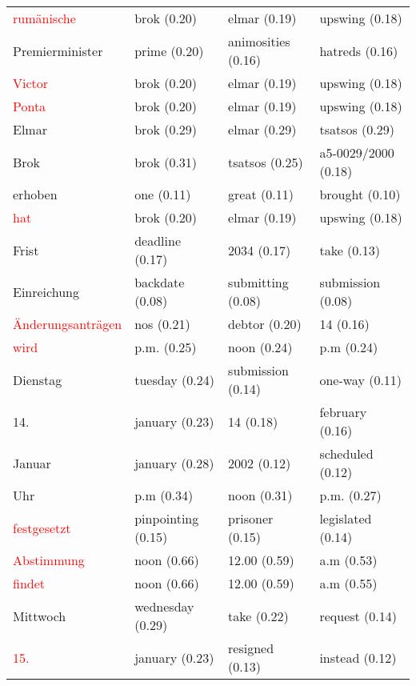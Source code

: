 \documentclass[11pt,twoside,openright]{mpreport}
\begin{document}
\begin{scriptsize}
\begin{tabular}{|llll|}
\textcolor{red}{rumänische}             & brok (0.20) & elmar (0.19) & upswing (0.18) \\
Premierminister         & prime (0.20) & animosities (0.16) & hatreds (0.16) \\ %
\textcolor{red}{Victor}                  & brok (0.20) & elmar (0.19) & upswing (0.18) \\
\textcolor{red}{Ponta}                   & brok (0.20) & elmar (0.19) & upswing (0.18) \\
Elmar                   & brok (0.29) & elmar (0.29) & tsatsos (0.29) \\ %
Brok                    & brok (0.31) & tsatsos (0.25) & a5-0029/2000 (0.18) \\ %
erhoben                 & one (0.11) & great (0.11) & brought (0.10) \\ %
\textcolor{red}{hat}                     & brok (0.20) & elmar (0.19) & upswing (0.18) \\
Frist                   & deadline (0.17) & 2034 (0.17) & take (0.13) \\ %
Einreichung             & backdate (0.08) & submitting (0.08) & submission (0.08) \\ %
\textcolor{red}{Änderungsanträgen}     & nos (0.21) & debtor (0.20) & 14 (0.16) \\
\textcolor{red}{wird}                    & p.m. (0.25) & noon (0.24) & p.m (0.24) \\
Dienstag                & tuesday (0.24) & submission (0.14) & one-way (0.11) \\ %
14.                     & january (0.23) & 14 (0.18) & february (0.16) \\ %
Januar                  & january (0.28) & 2002 (0.12) & scheduled (0.12) \\ %
Uhr                     & p.m (0.34) & noon (0.31) & p.m. (0.27) \\ %
\textcolor{red}{festgesetzt}             & pinpointing (0.15) & prisoner (0.15) & legislated (0.14) \\ %
\textcolor{red}{Abstimmung}              & noon (0.66) & 12.00 (0.59) & a.m (0.53) \\
\textcolor{red}{findet}                  & noon (0.66) & 12.00 (0.59) & a.m (0.55) \\
Mittwoch                & wednesday (0.29) & take (0.22) & request (0.14) \\ %
\textcolor{red}{15.}                     & january (0.23) & resigned (0.13) & instead (0.12) \\

\end{tabular}
\end{scriptsize}
\end{document}
